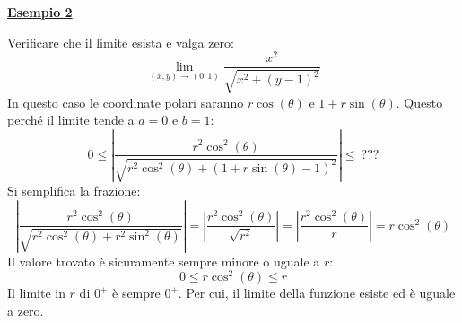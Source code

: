 \documentclass[a4paper]{article}
\newcommand{\example}[1]{\textcolor{Green4}{\textbf{#1}}}
\begin{document}
	\begin{flushleft}
		\example{\underline{Esempio 2}}
	\end{flushleft}
	Verificare che il limite esista e valga zero:
	\begin{equation*}
		\displaystyle\lim_{\left(x,y\right) \rightarrow \left(0,1\right)} \dfrac{x^{2}}{\sqrt{x^{2} + \left(y-1\right)^{2}}}
	\end{equation*}
	In questo caso le coordinate polari saranno $r \cos\left(\theta\right)$ e $1 + r\sin\left(\theta\right)$. Questo perché il limite tende a $a=0$ e $b=1$:
	\begin{equation*}
		0 \le \left| \dfrac{r^{2} \cos^{2}\left(\theta\right)}{\sqrt{r^{2} \cos^{2}\left(\theta\right) + \left(1 + r \sin\left(\theta\right)-1\right)^{2}}} \right| \le \: ???
	\end{equation*}
	Si semplifica la frazione:
	\begin{equation*}
		\left| \dfrac{r^{2} \cos^{2}\left(\theta\right)}{\sqrt{r^{2} \cos^{2}\left(\theta\right) + r^{2} \sin^{2}\left(\theta\right)}} \right| = \left| \dfrac{r^{2} \cos^{2}\left(\theta\right)}{\sqrt{r^{2}}} \right| = \left| \dfrac{r^{2} \cos^{2}\left(\theta\right)}{r} \right| = r \cos^{2}\left(\theta\right)
	\end{equation*}
	Il valore trovato è sicuramente sempre minore o uguale a $r$:
	\begin{equation*}
		0 \le r \cos^{2}\left(\theta\right) \le r
	\end{equation*}
	Il limite in $r$ di $0^{+}$ è sempre $0^{+}$. Per cui, il limite della funzione esiste ed è uguale a zero.\newpage
\end{document}
